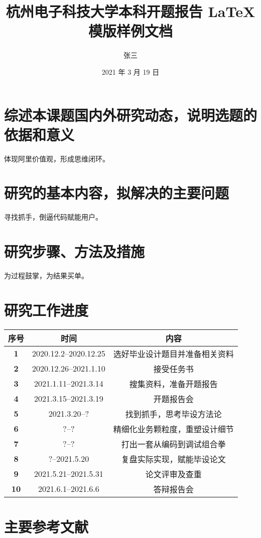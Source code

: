 \documentclass{HDU-Bachelor-Thesis-Proposal}
\title{杭州电子科技大学本科开题报告 \LaTeX{} 模版样例文档}
\author{张三}
\date{2021 年 3 月 19 日}
\begin{document}
\pagestyle{empty}

\maketitle
%

\clearpage

\section{综述本课题国内外研究动态，说明选题的依据和意义}

体现阿里价值观，形成思维闭环。

\section{研究的基本内容，拟解决的主要问题}

寻找抓手，倒逼代码赋能用户。

\section{研究步骤、方法及措施}

为过程鼓掌，为结果买单\cite{ali-quotes}。

\section{研究工作进度}

\begin{table}[h]%
	\centering
	\begin{tabular}{| c | c | c |}%
    \hline
	\bfseries 序号 & \bfseries 时间 & \bfseries 内容 \\ \hline
	\bfseries 1 & 2020.12.2--2020.12.25 & 选好毕业设计题目并准备相关资料 \\ \hline
	\bfseries 2 & 2020.12.26--2021.1.10 & 接受任务书 \\ \hline
    \bfseries 3 & 2021.1.11--2021.3.14 & 搜集资料，准备开题报告 \\ \hline
	\bfseries 4 & 2021.3.15--2021.3.19 & 开题报告会 \\ \hline
    \bfseries 5 & 2021.3.20--? & 找到抓手，思考毕设方法论 \\ \hline
	\bfseries 6 & ?--? & 精细化业务颗粒度，重塑设计细节 \\ \hline
    \bfseries 7 & ?--? & 打出一套从编码到调试组合拳 \\ \hline
	\bfseries 8 & ?--2021.5.20 & 复盘实际实现，赋能毕设论文 \\ \hline
    \bfseries 9 & 2021.5.21--2021.5.31 & 论文评审及查重 \\ \hline
	\bfseries 10 & 2021.6.1--2021.6.6 & 答辩报告会 \\ \hline
    \end{tabular}
\end{table}


\clearpage

\section{主要参考文献}
\printbibliography[heading=none]

\makeassessment
\end{document}
